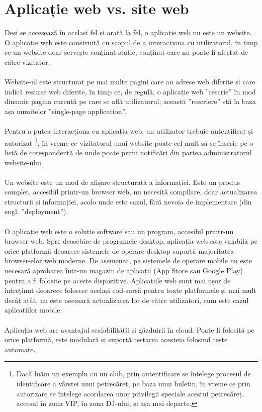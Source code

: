\section{Aplicație web vs. site web}
Deși se accesează în același fel și arată la fel, o aplicație web nu este un website.\\
O aplicație web este construită cu scopul de a interacționa cu utilizatorul, în timp ce un website doar servește conținut static, conținut care nu poate fi afectat de către vizitator.
\\ \\
Website-ul este structurat pe mai multe pagini care au adrese web diferite și care indică resurse web diferite, în timp ce, de regulă, o aplicație web ”rescrie” în mod dinamic pagina curentă pe care se află utilizatorul; această ”rescriere” stă la baza așa numitelor ”single-page application”.
\\ \\
Pentru a putea interacționa cu aplicația web, un utilizator trebuie autentificat și autorizat \footnote{Dacă luăm un exemplu cu un club, prin autentificare se înțelege procesul de identificare a vârstei unui petrecăreț, pe baza unui buletin, în vreme ce prin autorizare se înțelege acordarea unor privilegii speciale acestui petrecăreț, accesul în zona VIP, în zona DJ-ului, și așa mai departe.}, în vreme ce vizitatorul unui website poate cel mult să se înscrie pe o listă de corespondență de unde poate primi notificări din partea administratorul website-ului.
\\ \\
Un website este un mod de afișare structurată a informației. Este un produs complet, accesibil printr-un browser web, nu necesită compilare, doar actualizarea structurii și informației, acolo unde este cazul, fără nevoia de implementare (din engl. ”deployment”).
\\ \\
O aplicație web este o soluție software sau un program, accesibil printr-un browser web. Spre deosebire de programele desktop, aplicația web este valabilă pe orice platformă deoarece sistemele de operare desktop suportă majoritatea browser-elor web moderne. De asemenea, pe sistemele de operare mobile nu este necesară aprobarea într-un magazin de aplicații (App Store sau Google Play) pentru a fi folosite pe aceste dispozitive. Aplicațiile web sunt mai ușor de întreținut deoarece folosesc același cod-sursă pentru toate platformele și mai mult decât atât, nu este necesară actualizarea lor de către utilizatori, cum este cazul aplicațiilor mobile.
\\ \\
Aplicația web are avantajul scalabilității și găzduirii în cloud. Poate fi folosită pe orice platformă, este modulară și suportă testarea acesteia folosind teste automate.


